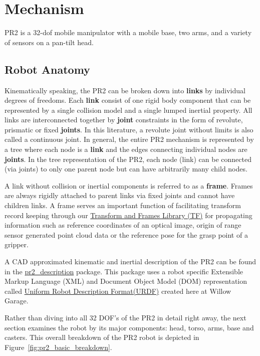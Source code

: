 \section{Mechanism}
PR2 is a 32-dof mobile manipulator with a mobile base, two arms, and a variety of sensors on a pan-tilt head.

\subsection{Robot Anatomy}

Kinematically speaking, the PR2 can be broken down into {\bf links} by individual degrees of freedoms.  Each {\bf link} consist of one
rigid body component that can be represented by a single collision model and a single lumped inertial property.
All links are interconnected together by {\bf joint} constraints in the form of revolute, prismatic or fixed {\bf joints}.
In this literature, a revolute joint without limits is also called a continuous joint.
In general, the entire PR2 mechanism is represented by a tree where each node is a {\bf link}
  and the edges connecting individual nodes are {\bf joints}.
In the tree representation of the PR2, each node (link) can be connected (via joints) to only one parent node but can have arbitrarily many child nodes.

A link without collision or inertial components is referred to as a {\bf frame}. Frames are always rigidly attached to parent links via fixed joints and cannot have children links.
A frame serves an important function of facilitating transform record keeping through our \href{http://www.ros.org/wiki/tf}{Transform and Frames Library (TF)}
  for propagating information such as reference coordinates of an optical image, origin of range sensor generated point cloud data or the reference pose for the grasp point of a gripper.

A CAD approximated kinematic and inertial description of the PR2 can be found
  in the \href{http://www.ros.org/wiki/pr2\_description}{pr2\_description} package.
This package uses a robot specific Extensible Markup Language (XML) and Document Object Model (DOM) representation
  called \href{http://www.ros.org/wiki/urdf}{Uniform Robot Description Format(URDF)} created here at Willow Garage.

Rather than diving into all 32 DOF's of the PR2 in detail right away, the next section examines the robot by its major components:  head, torso, arms, base and casters.
This overall breakdown of the PR2 robot is depicted in Figure~\ref{fig:pr2_basic_breakdown}.

